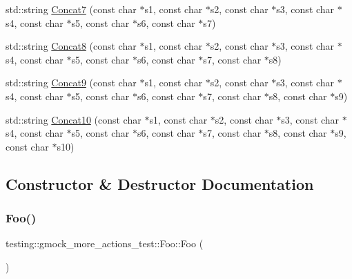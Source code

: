 \begin{DoxyCompactItemize}
std\+::string \mbox{\hyperlink{classtesting_1_1gmock__more__actions__test_1_1Foo_a5ff9313371e65a91b086afdc2032b0eb}{Concat7}} (const char $\ast$s1, const char $\ast$s2, const char $\ast$s3, const char $\ast$s4, const char $\ast$s5, const char $\ast$s6, const char $\ast$s7)
\item 
std\+::string \mbox{\hyperlink{classtesting_1_1gmock__more__actions__test_1_1Foo_a25b91cea8633d026fe3f4a36c1574b8e}{Concat8}} (const char $\ast$s1, const char $\ast$s2, const char $\ast$s3, const char $\ast$s4, const char $\ast$s5, const char $\ast$s6, const char $\ast$s7, const char $\ast$s8)
\item 
std\+::string \mbox{\hyperlink{classtesting_1_1gmock__more__actions__test_1_1Foo_a8f5b145b0cd23055630b2f9d10b3f45b}{Concat9}} (const char $\ast$s1, const char $\ast$s2, const char $\ast$s3, const char $\ast$s4, const char $\ast$s5, const char $\ast$s6, const char $\ast$s7, const char $\ast$s8, const char $\ast$s9)
\item 
std\+::string \mbox{\hyperlink{classtesting_1_1gmock__more__actions__test_1_1Foo_ad5b1d2dd1bcec98fdc90a05487ec3b14}{Concat10}} (const char $\ast$s1, const char $\ast$s2, const char $\ast$s3, const char $\ast$s4, const char $\ast$s5, const char $\ast$s6, const char $\ast$s7, const char $\ast$s8, const char $\ast$s9, const char $\ast$s10)
\end{DoxyCompactItemize}


\subsection{Constructor \& Destructor Documentation}
\mbox{\label{classtesting_1_1gmock__more__actions__test_1_1Foo_ad2603a65b94e019c75f4227787b9177e}} 
\subsubsection{\texorpdfstring{Foo()}{Foo()}}
{\footnotesize\ttfamily testing\+::gmock\+\_\+more\+\_\+actions\+\_\+test\+::\+Foo\+::\+Foo (\begin{DoxyParamCaption}{ }\end{DoxyParamCaption})\hspace{0.3cm}{\ttfamily [inline]}}



